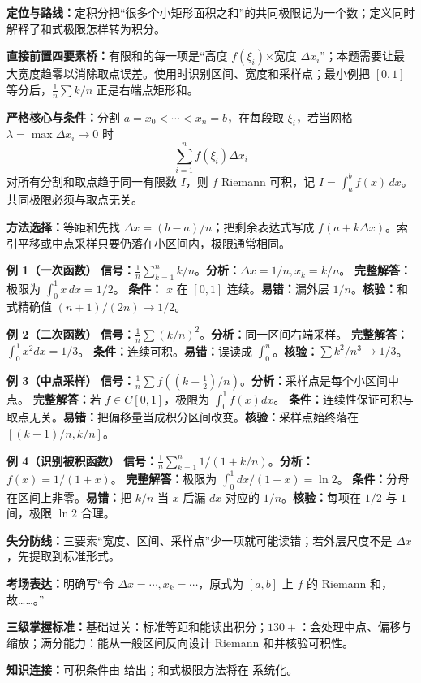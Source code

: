 
\par

\begin{knowledgeBox}
\textbf{定位与路线：}定积分把“很多个小矩形面积之和”的共同极限记为一个数；定义同时解释了和式极限怎样转为积分。

\textbf{直接前置四要素桥：}有限和的每一项是“高度 \(f(\xi_i)\)×宽度 \(\Delta x_i\)”；本题需要让最大宽度趋零以消除取点误差。使用时识别区间、宽度和采样点；最小例把 \([0,1]\) 等分后，\(\frac1n\sum k/n\) 正是右端点矩形和。

\textbf{严格核心与条件：}分割 \(a=x_0<\cdots<x_n=b\)，在每段取 \(\xi_i\)，若当网格 \(\lambda=\max\Delta x_i\to0\) 时
\[
\sum_{i=1}^n f(\xi_i)\Delta x_i
\]
对所有分割和取点趋于同一有限数 \(I\)，则 \(f\) Riemann 可积，记 \(I=\int_a^b f(x)\,dx\)。共同极限必须与取点无关。

\textbf{方法选择：}等距和先找 \(\Delta x=(b-a)/n\)；把剩余表达式写成 \(f(a+k\Delta x)\)。索引平移或中点采样只要仍落在小区间内，极限通常相同。

\textbf{例 1（一次函数）}\quad
\textbf{信号：}\(\frac1n\sum_{k=1}^n k/n\)。\textbf{分析：}\(\Delta x=1/n,x_k=k/n\)。
\textbf{完整解答：}极限为 \(\int_0^1x\,dx=1/2\)。
\textbf{条件：} \(x\) 在 \([0,1]\) 连续。\textbf{易错：}漏外层 \(1/n\)。\textbf{核验：}和式精确值 \((n+1)/(2n)\to1/2\)。

\textbf{例 2（二次函数）}\quad
\textbf{信号：}\(\frac1n\sum(k/n)^2\)。\textbf{分析：}同一区间右端采样。
\textbf{完整解答：}\(\int_0^1x^2dx=1/3\)。
\textbf{条件：}连续可积。\textbf{易错：}误读成 \(\int_0^n\)。\textbf{核验：}\(\sum k^2/n^3\to1/3\)。

\textbf{例 3（中点采样）}\quad
\textbf{信号：}\(\frac1n\sum f((k-\frac12)/n)\)。\textbf{分析：}采样点是每个小区间中点。
\textbf{完整解答：}若 \(f\in C[0,1]\)，极限为 \(\int_0^1f(x)dx\)。
\textbf{条件：}连续性保证可积与取点无关。\textbf{易错：}把偏移量当成积分区间改变。\textbf{核验：}采样点始终落在 \([(k-1)/n,k/n]\)。

\textbf{例 4（识别被积函数）}\quad
\textbf{信号：}\(\frac1n\sum_{k=1}^n1/(1+k/n)\)。\textbf{分析：} \(f(x)=1/(1+x)\)。
\textbf{完整解答：}极限为 \(\int_0^1dx/(1+x)=\ln2\)。
\textbf{条件：}分母在区间上非零。\textbf{易错：}把 \(k/n\) 当 \(x\) 后漏 \(dx\) 对应的 \(1/n\)。\textbf{核验：}每项在 \(1/2\) 与 \(1\) 间，极限 \(\ln2\) 合理。

\textbf{失分防线：}三要素“宽度、区间、采样点”少一项就可能读错；若外层尺度不是 \(\Delta x\)，先提取到标准形式。

\textbf{考场表达：}明确写“令 \(\Delta x=\cdots,x_k=\cdots\)，原式为 \([a,b]\) 上 \(f\) 的 Riemann 和，故……。”

\textbf{三级掌握标准：}基础过关：标准等距和能读出积分；\(130+\)：会处理中点、偏移与缩放；满分能力：能从一般区间反向设计 Riemann 和并核验可积性。

\textbf{知识连接：}可积条件由 给出；和式极限方法将在 系统化。
\end{knowledgeBox}

